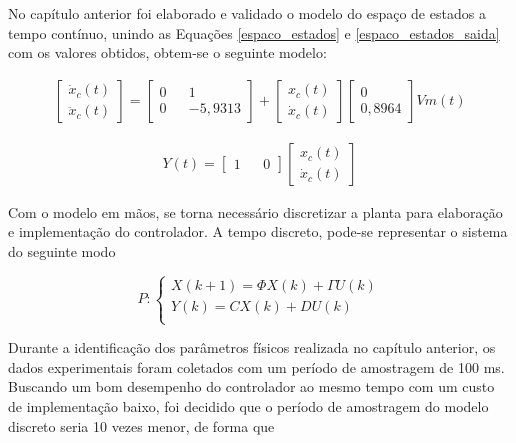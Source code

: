 No capítulo anterior foi elaborado e validado o modelo do espaço de estados a tempo contínuo, unindo as Equações \ref{espaco_estados} e \ref{espaco_estados_saida} com os valores obtidos, obtem-se o seguinte modelo:

\begin{gather}
    \begin{bmatrix}
        \dot{x}_c(t) \\ \ddot{x}_c(t)
    \end{bmatrix}=
    \begin{bmatrix}
        0 && 1 \\ 0 && -5,9313
    \end{bmatrix}
    +
    \begin{bmatrix}
        x_c(t) \\ \dot{x}_c(t)
    \end{bmatrix}
    \begin{bmatrix}
        0 \\ 0,8964
    \end{bmatrix}
    Vm(t)
    \label{espaco_estados1}
\end{gather}

\begin{gather}
    Y(t)=
    \begin{bmatrix}
        1 && 0
    \end{bmatrix}
    \begin{bmatrix}
        x_c(t) \\ \dot{x}_c(t)
    \end{bmatrix}
    \label{espaco_estados_saida1}
\end{gather}

Com o modelo em mãos, se torna necessário discretizar a planta para elaboração e implementação do controlador. A tempo discreto, pode-se representar o sistema do seguinte modo

\begin{equation}
    P :\begin{cases} 
        X(k+1) = \Phi X(k) + \varGamma U(k) \\
        Y(k) = CX(k) + DU(k) \\
        \end{cases}
    \label{modelo_espaco_estados_discreto}
\end{equation}

Durante a identificação dos parâmetros físicos realizada no capítulo anterior, os dados experimentais foram coletados com um período de amostragem de 100 ms. Buscando um bom desempenho do controlador ao mesmo tempo com um custo de implementação baixo, foi decidido que o período de amostragem do modelo discreto seria 10 vezes menor, de forma que

